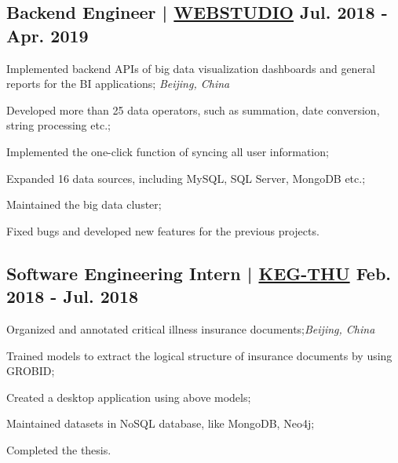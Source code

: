 \subsection{{Backend Engineer | \href{http://www.wbdatavis.com/}{WEBSTUDIO} \hfill Jul. 2018 - Apr. 2019}}
\begin{zitemize}
    \item Implemented backend APIs of big data visualization dashboards and general reports for the BI applications; \hfill \textit{Beijing, China}
    \item Developed more than 25 data operators, such as summation, date conversion, string processing etc.;
    \item Implemented the one-click function of syncing all user information;
    \item Expanded 16 data sources, including MySQL, SQL Server, MongoDB etc.;
    \item Maintained the big data cluster;
    \item Fixed bugs and developed new features for the previous projects.
\end{zitemize}

\subsection{{Software Engineering Intern | \href{https://keg.cs.tsinghua.edu.cn/}{KEG-THU} \hfill Feb. 2018 - Jul. 2018}}

\begin{zitemize}
    \item Organized and annotated critical illness insurance documents;\hfill \textit{Beijing, China}
    \item Trained models to extract the logical structure of insurance documents by using GROBID;
    \item Created a desktop application using above models;
    \item Maintained datasets in NoSQL database, like MongoDB, Neo4j;
    \item Completed the thesis.
\end{zitemize}

